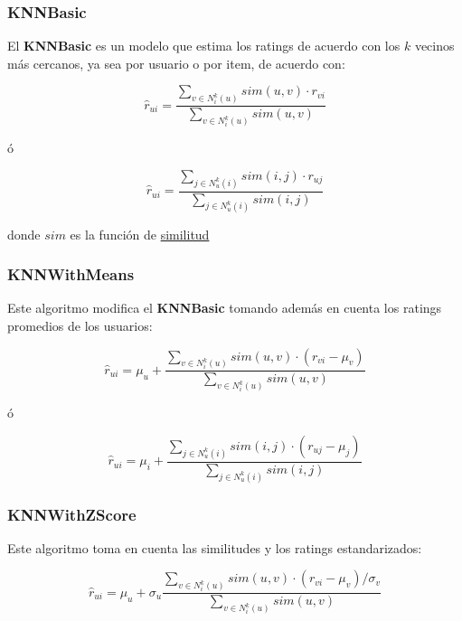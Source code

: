 \documentclass{article}
\begin{document}
\subsubsection{KNNBasic}

El \textbf{KNNBasic} es un modelo que estima los ratings de acuerdo con los $k$ vecinos más cercanos, ya sea por usuario o por item, de acuerdo con:

\begin{equation}
\hat r_{ui}=\frac{\sum_{v\in N_i^k(u)}sim(u,v) \cdot r_{vi}}{\sum_{v\in N_i^k(u)}sim(u,v)}
\end{equation}

ó

\begin{equation}
\hat r_{ui}=\frac{\sum_{j\in N_u^k(i)}sim(i,j) \cdot r_{uj}}{\sum_{j\in N_u^k(i)}sim(i,j)}
\end{equation}

donde $sim$ es la función de \href{https://surprise.readthedocs.io/en/stable/similarities.html#module-surprise.similarities}{similitud}


\subsubsection{KNNWithMeans}

Este algoritmo modifica el \textbf{KNNBasic} tomando además en cuenta los ratings promedios de los usuarios:

\begin{equation}
\hat r_{ui}=\mu_u + \frac{\sum_{v\in N_i^k(u)}sim(u,v) \cdot (r_{vi}-\mu_v)}{\sum_{v\in N_i^k(u)}sim(u,v)}
\end{equation}

ó

\begin{equation}
\hat r_{ui}=\mu_i + \frac{\sum_{j\in N_u^k(i)}sim(i,j) \cdot (r_{uj}-\mu_j)}{\sum_{j\in N_u^k(i)}sim(i,j)}
\end{equation}

\subsubsection{KNNWithZScore}

Este algoritmo toma en cuenta las similitudes y los ratings estandarizados:

\begin{equation}
\hat r_{ui}=\mu_u + \sigma_u\frac{\sum_{v\in N_i^k(u)}sim(u,v) \cdot (r_{vi}-\mu_v)/\sigma_v}{\sum_{v\in N_i^k(u)}sim(u,v)}
\end{equation}
\end{document}
